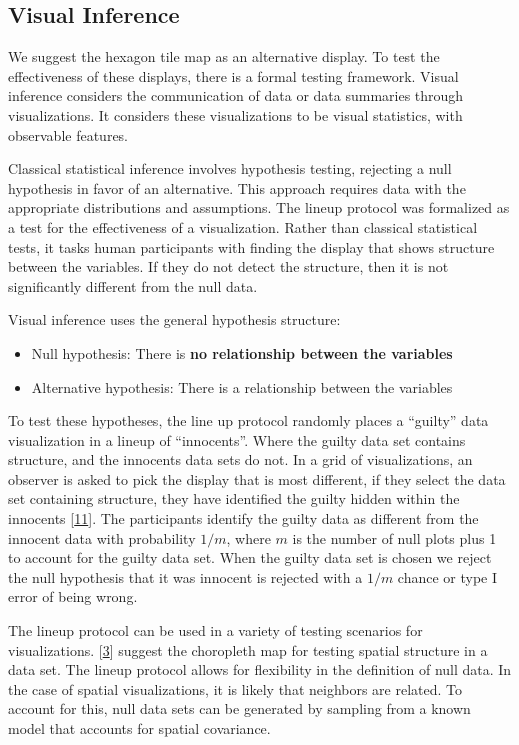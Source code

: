 \documentclass[conference,final,]{IEEEtran}
\providecommand{\tightlist}{%
  \setlength{\itemsep}{0pt}\setlength{\parskip}{0pt}}
\begin{document}
\hypertarget{visual-inference}{%
\subsection{Visual Inference}\label{visual-inference}}

We suggest the hexagon tile map as an alternative display. To test the effectiveness of these displays, there is a formal testing framework. Visual inference considers the communication of data or data summaries through visualizations. It considers these visualizations to be visual statistics, with observable features.

Classical statistical inference involves hypothesis testing, rejecting a null hypothesis in favor of an alternative. This approach requires data with the appropriate distributions and assumptions.
The lineup protocol was formalized as a test for the effectiveness of a visualization. Rather than classical statistical tests, it tasks human participants with finding the display that shows structure between the variables. If they do not detect the structure, then it is not significantly different from the null data.

Visual inference uses the general hypothesis structure:

\begin{itemize}
\tightlist
\item
  Null hypothesis: There is \bf{no} relationship between the variables
\item
  Alternative hypothesis: There is a relationship between the variables
\end{itemize}

To test these hypotheses, the line up protocol randomly places a ``guilty'' data visualization in a lineup of ``innocents''. Where the guilty data set contains structure, and the innocents data sets do not.
In a grid of visualizations, an observer is asked to pick the display that is most different, if they select the data set containing structure, they have identified the guilty hidden within the innocents {[}\protect\hyperlink{ref-GTPCCD}{11}{]}.
The participants identify the guilty data as different from the innocent data with probability \(1/m\), where \(m\) is the number of null plots plus 1 to account for the guilty data set. When the guilty data set is chosen we reject the null hypothesis that it was innocent is rejected with a \(1/m\) chance or type I error of being wrong.

The lineup protocol can be used in a variety of testing scenarios for visualizations. {[}\protect\hyperlink{ref-GIIV}{3}{]} suggest the choropleth map for testing spatial structure in a data set. The lineup protocol allows for flexibility in the definition of null data. In the case of spatial visualizations, it is likely that neighbors are related. To account for this, null data sets can be generated by sampling from a known model that accounts for spatial covariance.
\end{document}
